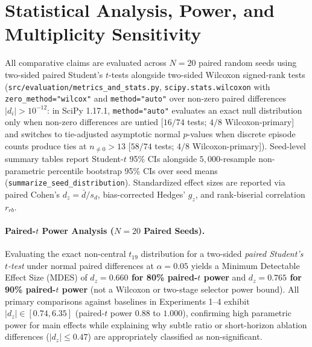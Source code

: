 \documentclass[10pt,letterpaper]{article}
\begin{document}
\section{Statistical Analysis, Power, and Multiplicity Sensitivity}
\label{sec:stats}
All comparative claims are evaluated across $N=20$ paired random seeds using two-sided paired Student's $t$-tests alongside two-sided Wilcoxon signed-rank tests (\texttt{src/\allowbreak evaluation/\allowbreak metrics\_\allowbreak and\_\allowbreak stats.py}, \texttt{scipy.\allowbreak stats.\allowbreak wilcoxon} with \texttt{zero\_\allowbreak method=\allowbreak"wilcox"} and \texttt{method=\allowbreak"auto"} over non-zero paired differences $|d_i| > 10^{-12}$: in SciPy 1.17.1, \texttt{method=\allowbreak"auto"} evaluates an exact null distribution only when non-zero differences are untied [$16/74$ tests; $4/8$ Wilcoxon-primary] and switches to tie-adjusted asymptotic normal $p$-values when discrete episode counts produce ties at $n_{\neq 0} > 13$ [$58/74$ tests; $4/8$ Wilcoxon-primary]). Seed-level summary tables report Student-$t$ 95\% CIs alongside $5{,}000$-resample non-parametric percentile bootstrap 95\% CIs over seed means (\texttt{summarize\_\allowbreak seed\_\allowbreak distribution}). Standardized effect sizes are reported via paired Cohen's $d_z = \bar{d}/s_d$, bias-corrected Hedges' $g_z$, and rank-biserial correlation $r_{rb}$.

\paragraph{Paired-$t$ Power Analysis ($N=20$ Paired Seeds).}
Evaluating the exact non-central $t_{19}$ distribution for a two-sided \emph{paired Student's $t$-test} under normal paired differences at $\alpha=0.05$ yields a Minimum Detectable Effect Size (MDES) of \textbf{$d_z = 0.660$ for 80\% paired-$t$ power} and \textbf{$d_z = 0.765$ for 90\% paired-$t$ power} (not a Wilcoxon or two-stage selector power bound). All primary comparisons against baselines in Experiments 1--4 exhibit $|d_z| \in [0.74, 6.35]$ (paired-$t$ power $0.88$ to $1.000$), confirming high parametric power for main effects while explaining why subtle ratio or short-horizon ablation differences ($|d_z| \le 0.47$) are appropriately classified as non-significant.
\end{document}
